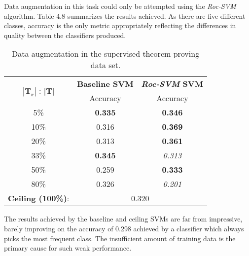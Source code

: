 \documentclass[12pt,twoside,notitlepage,amsart]{report} %
\begin{document}
Data augmentation in this task could only be attempted using the \emph{Roc-SVM} algorithm. Table 4.8 summarizes the results achieved. As there are five different classes, accuracy is the only metric appropriately reflecting the differences in quality between the classifiers produced. 
	

	\begin{table} [h] 
	\begin{center}
	\caption{Data augmentation in the supervised theorem proving data set.}
	
	\begin{adjustbox}{center}
	\renewcommand{\arraystretch}{1.2}
	\begin{tabular}{||c||c||c||}
	
	\hline
	
	\multirow{2}{*}{$|\mathbf{T_r}|$ : $|\mathbf{T}|$ } & \multicolumn{1}{|c||}{\textbf{Baseline SVM}} & \multicolumn{1}{|c||}{\textbf{\emph{Roc-SVM} SVM}}  \\\cline{2-3}
	
	& Accuracy & Accuracy \\
	\hline \hline
	5\%   &  \textbf{0.335}  &  \textbf{0.346}  \\ \hline
	
	10\%  &  0.316  &  \textbf{0.369}  \\ \hline %
	
	20\%  &  0.313  &  \textbf{0.361}  \\ \hline
	
	33\%  &  \textbf{0.345}  &  \emph{0.313}  \\ \hline 
	
	50\%  &  0.259  &  \textbf{0.333}  \\ \hline
	
	80\%  &  0.326  &  \emph{0.201}  \\ \hline 

	\hline
	\textbf{\small{Ceiling (100\%)}}: & \multicolumn{2}{|c||}{   0.320   }   \\
	                                                             
	\hline  
	
	\end{tabular}
	\end{adjustbox}
	\end{center}
	\end{table}	
		
The results achieved by the baseline and ceiling SVMs are far from impressive, barely improving on the accuracy of 0.298 achieved by a classifier which always picks the most frequent class. The insufficient amount of training data is the primary cause for such weak performance. 
\end{document}
